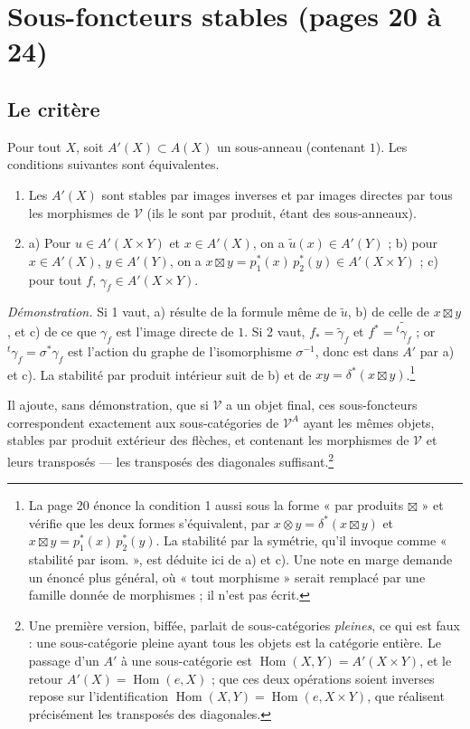\documentclass[11pt,a4paper]{article}
\begin{document}
\section*{Sous-foncteurs stables (pages 20 à 24)}

\subsection*{Le critère}

Pour tout $X$, soit $A'(X) \subset A(X)$ un sous-anneau (contenant $1$).
Les conditions suivantes sont équivalentes.

\begin{enumerate}
  \item Les $A'(X)$ sont stables par images inverses et par images directes
  par tous les morphismes de $\mathcal{V}$ (ils le sont par produit, étant des
  sous-anneaux).
  \item a) Pour $u \in A'(X \times Y)$ et $x \in A'(X)$, on a
  $\tilde{u}(x) \in A'(Y)$ ; b) pour $x \in A'(X)$, $y \in A'(Y)$, on a
  $x \boxtimes y = p_{1}^{*}(x)\, p_{2}^{*}(y) \in A'(X \times Y)$ ; c) pour
  tout $f$, $\gamma_{f} \in A'(X \times Y)$.
\end{enumerate}

\emph{Démonstration.} Si 1 vaut, a) résulte de la formule même de
$\tilde{u}$, b) de celle de $x \boxtimes y$, et c) de ce que $\gamma_{f}$ est
l'image directe de $1$. Si 2 vaut, $f_{*} = \tilde{\gamma}_{f}$ et
$f^{*} = \widetilde{{}^{t}\gamma_{f}}$ ; or ${}^{t}\gamma_{f} = \sigma^{*}\gamma_{f}$
est l'action du graphe de l'isomorphisme $\sigma^{-1}$, donc est dans $A'$ par
a) et c). La stabilité par produit intérieur suit de b) et de
$x y = \delta^{*}(x \boxtimes y)$.\footnote{La page 20 énonce la condition 1
aussi sous la forme « par produits $\boxtimes$ » et vérifie que les deux formes
s'équivalent, par $x \otimes y = \delta^{*}(x \boxtimes y)$ et
$x \boxtimes y = p_{1}^{*}(x)\, p_{2}^{*}(y)$. La stabilité par la symétrie,
qu'il invoque comme « stabilité par isom. », est déduite ici de a) et c).
Une note en marge demande un énoncé plus général, où « tout morphisme » serait
remplacé par une famille donnée de morphismes ; il n'est pas écrit.}

Il ajoute, sans démonstration, que si $\mathcal{V}$ a un objet final, ces
sous-foncteurs correspondent exactement aux sous-catégories de
$\mathcal{V}^{A}$ ayant les mêmes objets, stables par produit extérieur des
flèches, et contenant les morphismes de $\mathcal{V}$ et leurs transposés
--- les transposés des diagonales suffisant.\footnote{Une première version,
biffée, parlait de sous-catégories \emph{pleines}, ce qui est faux : une
sous-catégorie pleine ayant tous les objets est la catégorie entière. Le
passage d'un $A'$ à une sous-catégorie est
$\operatorname{Hom}(X, Y) = A'(X \times Y)$, et le retour
$A'(X) = \operatorname{Hom}(e, X)$ ; que ces deux opérations soient inverses
repose sur l'identification
$\operatorname{Hom}(X, Y) = \operatorname{Hom}(e, X \times Y)$, que réalisent
précisément les transposés des diagonales.}
\end{document}
